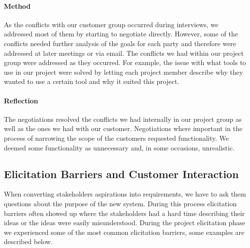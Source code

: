 \documentclass[10pt]{article}
\begin{document}
\paragraph{Method}
\hfill \break
As the conflicts with our customer group occurred during interviews, we addressed most of them by starting to negotiate directly. However, some of the conflicts needed further analysis of the goals for each party and therefore were addressed at later meetings or via email. The conflicts we had within our project group were addressed as they occurred. For example, the issue with what tools to use in our project were solved by letting each project member describe why they wanted to use a certain tool and why it suited this project. 

\paragraph{Reflection}
\hfill \break
The negotiations resolved the conflicts we had internally in our project group as well as the ones we had with our customer. Negotiations where important in the process of narrowing the scope of the customers requested functionality. We deemed some functionality as unnecessary and, in some occasions, unrealistic.


\subsection{Elicitation Barriers and Customer Interaction}
When converting stakeholders aspirations into requirements, we  have to ask them questions about the purpose of the new system. During this process elicitation barriers often showed up where the stakeholders had a hard time describing their ideas or the ideas were easily misunderstood. During the project elicitation phase we experienced some of the most common elicitation barriers, some examples are described below.
\end{document}
